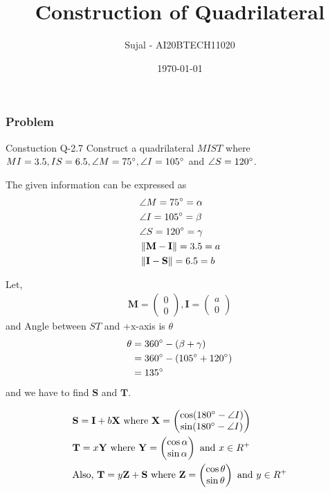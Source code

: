 \documentclass{beamer}
\title{Construction of Quadrilateral}
\author{Sujal - AI20BTECH11020}
\date{\today}
\newcommand\norm[1]{\left\lVert#1\right\rVert}
\newcommand{\myvec}[1]{\ensuremath{\begin{pmatrix}#1\end{pmatrix}}}
\renewcommand{\vec}[1]{\mathbf{#1}}
\begin{document}
\begin{frame}
\titlepage
\end{frame}
\begin{frame}
\frametitle{Problem}
\begin{block}{Constuction Q-2.7}
Construct a quadrilateral $MIST$ where $MI = 3.5, IS = 6.5, \angle M = 75 \degree , \angle I = 105 \degree$ and $ \angle S = 120 \degree$.
\end{block}
The given information can be expressed as
    \begin{align}
    &\angle M = 75\degree = \alpha \label{eq 1}
    \\
    &\angle I = 105\degree = \beta \label{eq 2}
    \\
    &\angle S = 120\degree = \gamma \label{eq 3}
    \\
    &\norm{\vec{M}-\vec{I}} = 3.5 = a \label{eq 4}
    \\
    &\norm{\vec{I}-\vec{S}} = 6.5 = b \label{eq 5}
    \end{align}
\end{frame}
\begin{frame}
Let,
\begin{align}
\vec{M}=\myvec{0\\0},\vec{I}=\myvec{a\\0}
\end{align}
and Angle between $ST$ and +x-axis is $\theta$
\begin{align}
\theta &= 360\degree - (\beta + \gamma)\\
       &= 360\degree - (105\degree + 120\degree)\\
       &= 135\degree \label{eq a}
\end{align}
and we have to find $\vec{S}$ and $\vec{T}$.
\end{frame}
\begin{frame}
\begin{lemma}
\begin{align}
&\vec{S} =\vec{I} + b\vec{X} \text{ where } \vec{X} = \myvec{\cos (180\degree -\angle I)\\\sin (180\degree -\angle I)} \label{eq b}\\
&\vec{T} = x\vec{Y} \text{ where } \vec{Y} = \myvec{\cos\alpha\\\sin \alpha}\text{ and } x \in R^{+} \label{eq c}\\
&\text{Also, } \vec{T} = y\vec{Z}+\vec{S} \text{ where } \vec{Z} =  \myvec{\cos\theta\\\sin\theta} \text{ and }y \in R^{+} \label{eq d}
\end{align}
\end{lemma}
\end{frame}
\end{document}
